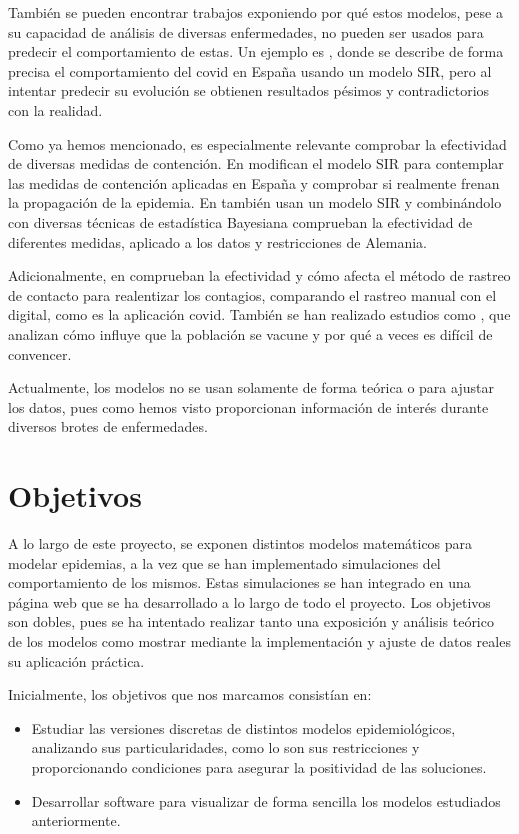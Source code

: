 También se pueden encontrar trabajos exponiendo por qué estos modelos, pese a su capacidad de análisis de diversas enfermedades, no pueden ser usados para predecir el comportamiento de estas. Un ejemplo es \cite{turningpoint}, donde se describe de forma precisa el comportamiento del covid en España usando un modelo SIR, pero al intentar predecir su evolución se obtienen resultados pésimos y contradictorios con la realidad.

Como ya hemos mencionado, es especialmente relevante comprobar la efectividad de diversas medidas de contención. En \cite{gutierrez2020analisis} modifican el modelo SIR para contemplar las medidas de contención aplicadas en España y comprobar si realmente frenan la propagación de la epidemia. En \cite{inferringinterventions} también usan un modelo SIR y combinándolo con diversas técnicas de estadística Bayesiana comprueban la efectividad de diferentes medidas, aplicado a los datos y restricciones de Alemania.

Adicionalmente, en \cite{Mancastroppa2021} comprueban la efectividad y cómo afecta el método de rastreo de contacto para realentizar los contagios, comparando el rastreo manual con el digital, como es la aplicación covid. También se han realizado estudios como \cite{vaccinationproblem}, que analizan cómo influye que la población se vacune y por qué a veces es difícil de convencer.

Actualmente, los modelos no se usan solamente de forma teórica o para ajustar los datos, pues como hemos visto proporcionan información de interés durante diversos brotes de enfermedades.


\section{Objetivos}

A lo largo de este proyecto, se exponen distintos modelos matemáticos para modelar epidemias, a la vez que se han implementado simulaciones del comportamiento de los mismos. Estas simulaciones se han integrado en una página web que se ha desarrollado a lo largo de todo el proyecto. Los objetivos son dobles, pues se ha intentado realizar tanto una exposición y análisis teórico de los modelos como mostrar mediante la implementación y ajuste de datos reales su aplicación práctica.

Inicialmente, los objetivos que nos marcamos consistían en:

\begin{itemize}
\item Estudiar las versiones discretas de distintos modelos epidemiológicos, analizando sus particularidades, como lo son sus restricciones y proporcionando condiciones para asegurar la positividad de las soluciones.
\item Desarrollar software para visualizar de forma sencilla los modelos estudiados anteriormente.
\end{itemize}


